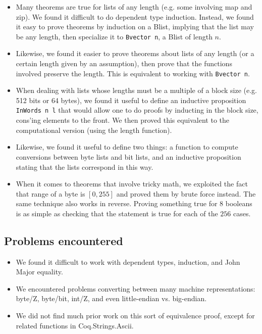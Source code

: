 \documentclass[twocolumn,showpacs,%
  nofootinbib,aps,superscriptaddress,%
  eqsecnum,prd,notitlepage,showkeys,10pt]{revtex4-1}
\begin{document}
\begin{itemize}
\item Many theorems are true for lists of any length (e.g. some involving map and zip). We found it difficult to do dependent type induction. Instead, we found it easy to prove theorems by induction on a Blist, implying that the list may be any length, then specialize it to \verb|Bvector n|, a Blist of length $n$. 
\item Likewise, we found it easier to prove theorems about lists of any length (or a certain length given by an assumption), then prove that the functions involved preserve the length. This is equivalent to working with \verb|Bvector n|.
\item When dealing with lists whose lengths must be a multiple of a block size (e.g. 512 bits or 64 bytes), we found it useful to define an inductive proposition \verb|InWords n l| that would allow one to do proofs by inducting in the block size, cons'ing elements to the front. We then proved this equivalent to the computational version (using the length function).
\item Likewise, we found it useful to define two things: a function to compute conversions between byte lists and bit lists, and an inductive proposition stating that the lists correspond in this way.
\item When it comes to theorems that involve tricky math, we exploited the fact that range of a byte is $[0, 255]$ and proved them by brute force instead. The same technique also works in reverse. Proving something true for $8$ booleans is as simple as checking that the statement is true for each of the $256$ cases.
\end{itemize}

\subsection{Problems encountered}

\begin{itemize}
\item We found it difficult to work with dependent types, induction, and John Major equality.
\item We encountered problems converting between many machine representations: byte/Z, byte/bit, int/Z, and even little-endian vs. big-endian.
\item We did not find much prior work on this sort of equivalence proof, except for related functions in Coq.Strings.Ascii.
\end{itemize}
\end{document}
